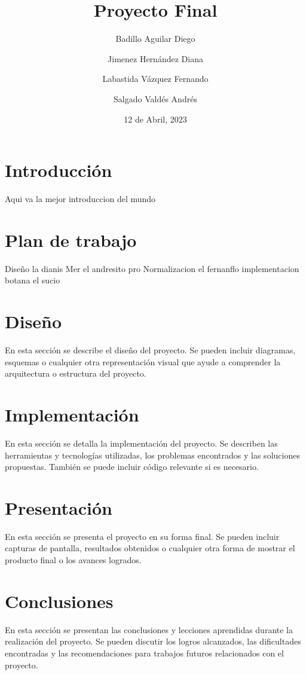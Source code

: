\documentclass{article}
\title{Proyecto Final}
\author{Badillo Aguilar Diego \and Jimenez Hernández Diana \and Labastida Vázquez Fernando \and Salgado Valdés Andrés}
\date{12 de Abril, 2023}
\begin{document}
\maketitle

\section*{Introducción}
Aqui va la mejor introduccion del mundo


\section*{Plan de trabajo}
Diseño la dianis
Mer el andresito pro
Normalizacion el fernanflo
implementacion botana el sucio
\section*{Diseño}
En esta sección se describe el diseño del proyecto. Se pueden incluir diagramas, esquemas o cualquier otra representación visual que ayude a comprender la arquitectura o estructura del proyecto.

\section*{Implementación}
En esta sección se detalla la implementación del proyecto. Se describen las herramientas y tecnologías utilizadas, los problemas encontrados y las soluciones propuestas. También se puede incluir código relevante si es necesario.

\section*{Presentación}
En esta sección se presenta el proyecto en su forma final. Se pueden incluir capturas de pantalla, resultados obtenidos o cualquier otra forma de mostrar el producto final o los avances logrados.

\section*{Conclusiones}
En esta sección se presentan las conclusiones y lecciones aprendidas durante la realización del proyecto. Se pueden discutir los logros alcanzados, las dificultades encontradas y las recomendaciones para trabajos futuros relacionados con el proyecto.
\end{document}
